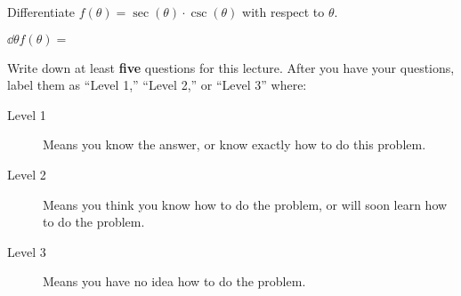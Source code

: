 \documentclass{ximera}
\begin{document}
\begin{question}
  Differentiate $f(\theta) = \sec(\theta)\cdot\csc(\theta)$ with respect to $\theta$.
  \begin{prompt}
    $\dd{\theta} f(\theta) = $
  \end{prompt}
\end{question}

\begin{question}
Write down at least \textbf{five} questions for this lecture. After
you have your questions, label them as ``Level 1,'' ``Level 2,'' or ``Level 3'' where:
\begin{description}
\item[Level 1] Means you know the answer, or know exactly how to do this problem.
\item[Level 2] Means you think you know how to do the problem, or will soon learn how to do the problem.
\item[Level 3] Means you have no idea how to do the problem. 
\end{description}
  \begin{freeResponse}
  \end{freeResponse}
\end{question}
\end{document}
